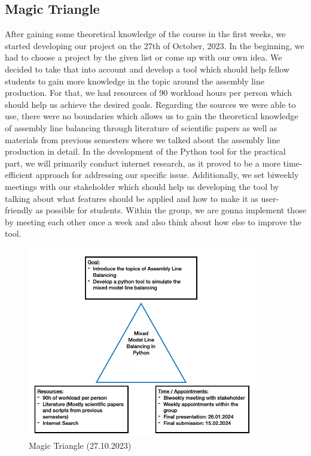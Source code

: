 \subsection{Magic Triangle}
After gaining some theoretical knowledge of the course in the first weeks, we started developing our project on the 27th of October, 2023. In the beginning, we had to choose a project by the given list or come up with our own idea. We decided to take that into account and develop a tool which should help fellow students to gain more knowledge in the topic around the assembly line production. For that, we had resources of 90 workload hours per person which should help us achieve the desired goals. Regarding the sources we were able to use, there were no boundaries which allows us to gain the theoretical knowledge of assembly line balancing through literature of scientific papers as well as materials from previous semesters where we talked about the assembly line production in detail. In the development of the Python tool for the practical part, we will primarily conduct internet research, as it proved to be a more time-efficient approach for addressing our specific issue. Additionally, we set biweekly meetings with our stakeholder which should help us developing the tool by talking about what features should be applied and how to make it as user-friendly as possible for students. Within the group, we are gonna implement those by meeting each other once a week and also think about how else to improve the tool. 
\begin{figure}[H]
\centering
\includegraphics[width=10cm]{Abbildungen/Magic_Triangle_start.png}	
\caption{Magic Triangle (27.10.2023)}
\label{fig:Magic_Triangle_start}
\end{figure}
\noindent
